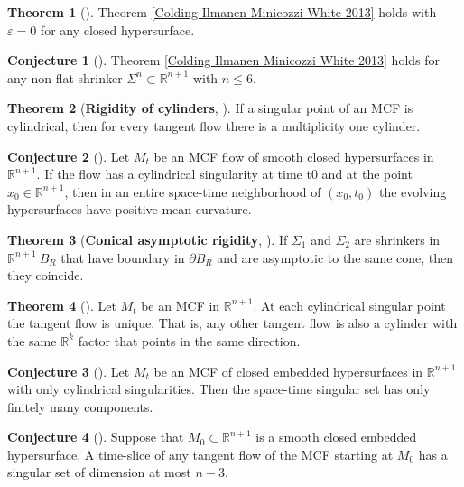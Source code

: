 \documentclass{amsart}
\theoremstyle{definition}
\newtheorem{Thm}{Theorem}[section]
\newtheorem{Con}{Conjecture}[section]
\begin{document}
\begin{refsection}
 \begin{Thm}[\cite{BernsteinWang2016}]
Theorem \ref{Colding Ilmanen Minicozzi White 2013} holds  with $\varepsilon = 0$ for any closed hypersurface.
\end{Thm}

\begin{Con}[\cite{ColdingMinicozziPedersen2015}] Theorem \ref{Colding Ilmanen Minicozzi White 2013} holds for any
non-flat shrinker ${\Sigma}^{n}  \subset {\mathbb{R}}^{n+1}$ with $n \leq 6$.
\end{Con}

\begin{Thm}[\textbf{Rigidity of cylinders}, \cite{ColdingIlmanenMinicozzi2015}]
If a singular point of an MCF is cylindrical, then for every tangent flow there is a multiplicity one cylinder. 
\end{Thm}

\begin{Con}[\cite{ColdingMinicozziPedersen2015}] Let ${M}_{t}$  be an MCF flow of smooth closed hypersurfaces in
${\mathbb{R}}^{n+1}$. If the flow has a cylindrical singularity at time t0 and at the point $x_0 \in {\mathbb{R}}^{n+1}$, then in an 
entire space-time neighborhood of $\left(x_0,t_0\right)$ the evolving hypersurfaces have positive mean curvature.
\end{Con}

\begin{Thm}[\textbf{Conical asymptotic rigidity}, \cite{Wang2014}]
If ${\Sigma}_{1}$ and ${\Sigma}_{2}$ are shrinkers in ${\mathbb{R}}^{n+1} \ B_{R}$ that have boundary in $\partial B_{R}$ 
and are asymptotic to the same cone, then they coincide.
\end{Thm}

 \begin{Thm}[\cite{ColdingMinicozzi2015a}] Let ${M}_{t}$ be an MCF in ${\mathbb{R}}^{n+1}$. At each cylindrical singular
 point the tangent flow is unique. That is, any other tangent flow is also a cylinder with the same ${\mathbb{R}}^{k}$ factor 
 that points in the same direction.
\end{Thm}
   
\begin{Con}[\cite{ColdingMinicozzi2016}]
  Let ${M}_{t}$ be an MCF of closed embedded hypersurfaces in ${\mathbb{R}}^{n+1}$ with only cylindrical singularities. Then 
  the space-time singular set has only finitely many components.
\end{Con}

\begin{Con}[\cite{Ilmanen1995}]
 Suppose that  ${M}_{0}  \subset {\mathbb{R}}^{n+1}$ is a smooth closed embedded hypersurface. A time-slice of any tangent flow of the MCF starting at 
  ${M}_{0}$ has a singular set of dimension at most $n-3$.
\end{Con}

\printbibliography[heading=subbibliography]
\end{refsection}
\end{document}
